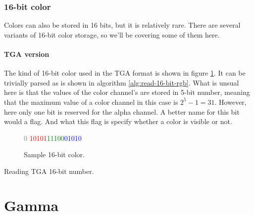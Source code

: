 \subsubsection{16-bit color}

Colors can also be stored in 16 bits, but it is relatively
rare. There are several variants of 16-bit color storage, so we'll
be covering some of them here.

\paragraph{TGA version}

The kind of 16-bit color used in the TGA format is shown in figure
\ref{fig:tga-16-bit-colors-bits}. It can be trivially parsed as is
shown in algorithm \ref{alg:read-16-bit-rgb}. What is unsual here is
that the values of the color channel's are stored in 5-bit number,
meaning that the maximum value of a color channel in this case is
$2^5 - 1 = 31$. However, here only one bit is reserved for the alpha
channel. A better name for this bit would a flag. And what this flag
is specify whether a color is visible or not.

\begin{figure}
  \centering
  {\huge\textcolor{gray}{0}%
    \textcolor{red}{10101}\textcolor{green}{11100}\textcolor{blue}{01010}}
  \caption{Sample 16-bit color.}
  \label{fig:tga-16-bit-colors-bits}
\end{figure}


\begin{algorithm}[H]
  \caption{Reading TGA 16-bit number.}
  \label{alg:read-16-bit-rgb}
  \begin{algorithmic}[1]
  \end{algorithmic}
\end{algorithm}

\section{Gamma}

\cite{roelofs99:_png}
\cite{boutel:_png_portab_networ_graph_specif_version11}
\cite{boutel:_png_portab_networ_graph_specif_version1}
\cite{boutel:_png_portab_networ_graph_specif_version12}
\cite{Pascale2003_ReviewRGBColourSpaces}
\cite{srgb}

